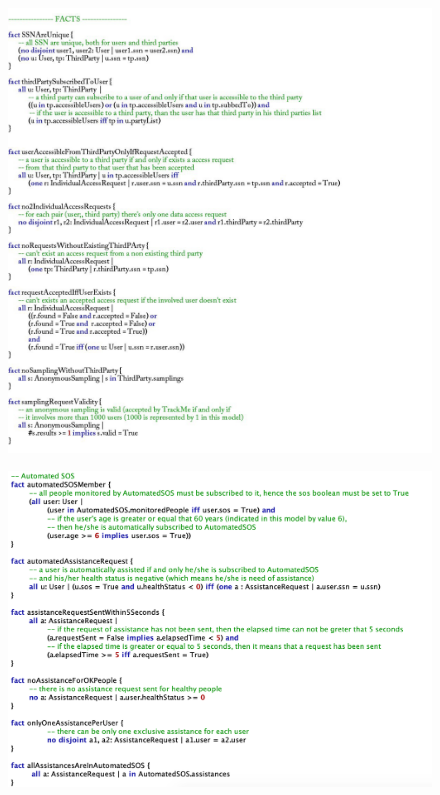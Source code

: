 \documentclass[12pt,a4paper]{article}
\begin{document}
	\begin{figure}[H]
		\centering
		\includegraphics[width=1.3\linewidth]{Images/facts1}
		\label{fig:facts1}
	\end{figure}
		\begin{figure}[H]
		\centering
		\includegraphics[width=1.3\linewidth]{Images/facts2}
		\label{fig:facts2}
	\end{figure}
\end{document}
